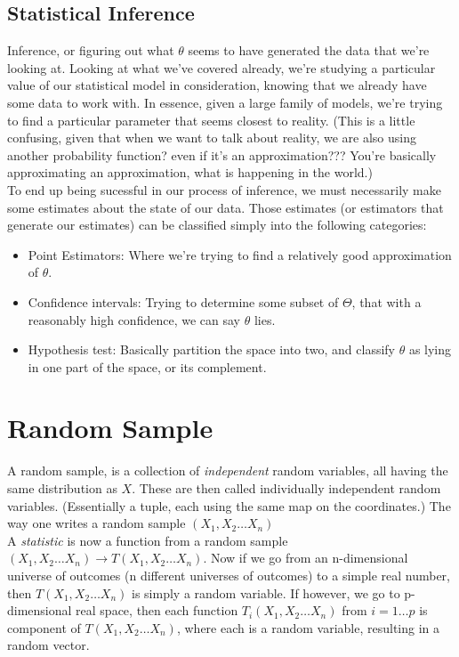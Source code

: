 \documentclass[12pt]{book}
\theoremstyle{definition}
\begin{document}
\subsection{Statistical Inference}
Inference, or figuring out what $\theta$ seems to have generated the data that we're looking at. Looking at what we've covered already, we're studying a particular value of our statistical model in consideration, knowing that we already have some data to work with. In essence, given a large family of models, we're trying to find a particular parameter that seems closest to reality. (This is a little confusing, given that when we want to talk about reality, we are also using another probability function? even if it's an approximation??? You're basically approximating an approximation, what is happening in the world.)\\
To end up being sucessful in our process of inference, we must necessarily make some estimates about the state of our data. Those estimates (or estimators that generate our estimates) can be classified simply into the following categories:\begin{itemize}
    \item Point Estimators: Where we're trying to find a relatively good approximation of $\theta$.
    \item Confidence intervals: Trying to determine some subset of $\Theta$, that with a reasonably high confidence, we can say $\theta$ lies.
    \item Hypothesis test: Basically partition the space into two, and classify $\theta$ as lying in one part of the space, or its complement.
\end{itemize}
\section{Random Sample}
A random sample, is a collection of \textit{independent} random variables, all having the same distribution as $X$. These are then called individually independent random variables. (Essentially a tuple, each using the same map on the coordinates.) The way one writes a random sample $(X_1, X_2 \ldots X_n)$\\
A \textit{statistic} is now a function from a random sample $(X_1, X_2 \ldots X_n) \to T(X_1, X_2 \ldots X_n)$. Now if we go from an n-dimensional universe of outcomes (n different universes of outcomes) to a simple real number, then $T(X_1, X_2 \ldots X_n)$ is simply a random variable. If however, we go to p-dimensional real space, then each function $T_i(X_1, X_2 \ldots X_n)$ from $i = 1 \ldots p$ is component of $T(X_1, X_2 \ldots X_n)$, where each is a random variable, resulting in a random vector. 
\end{document}
